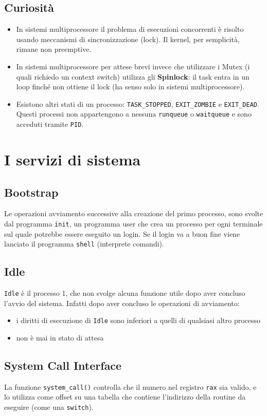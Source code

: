 \documentclass[12pt, a4paper]{report}
\begin{document}
\section{Curiosità}
\begin{itemize}
	\item In sistemi multiprocessore il problema di esecuzioni concorrenti è
		risolto usando meccanismi di sincronizzazione (lock). Il kernel,
		per semplicità, rimane non preemptive.
	\item In sistemi multiprocessore per attese brevi invece che utilizzare i
		Mutex (i quali richiedo un context switch) utilizza gli
		\textbf{Spinlock}: il task entra in un loop finché non ottiene il lock
		(ha senso solo in sistemi multiprocessore).
	\item Esistono altri stati di un processo: \texttt{TASK\_STOPPED},
		\texttt{EXIT\_ZOMBIE} e \texttt{EXIT\_DEAD}. Questi processi non
		appartengono a nessuna \texttt{runqueue} o \texttt{waitqueue} e sono
		acceduti tramite \texttt{PID}.
\end{itemize}

\chapter{I servizi di sistema}
\section{Bootstrap}
Le operazioni avviamento successive alla creazione del primo processo, sono
svolte dal programma \texttt{init}, un programma user che crea un processo per
ogni terminale sul quale potrebbe essere eseguito un login. Se  il login va a
buon fine viene lanciato il programma \texttt{shell} (interprete comandi).

\section{Idle}
\texttt{Idle} è il processo 1, che non svolge alcuna funzione utile dopo aver
concluso l'avvio del sistema. Infatti dopo aver concluso le operazioni di
avviamento:
\begin{itemize}
	\item i diritti di esecuzione di \texttt{Idle} sono inferiori a quelli di
		qualsiasi altro processo
	\item non è mai in stato di attesa
\end{itemize}

\section{System Call Interface}
La funzione \texttt{system\_call()} controlla che il numero nel registro
\texttt{rax} sia valido, e lo utilizza come offset su una tabella che contiene
l'indirizzo della routine da eseguire (come una \texttt{switch}).
\end{document}
